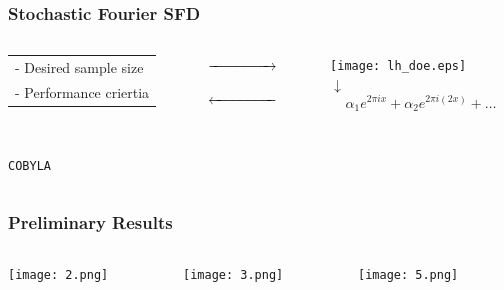 \documentclass[aspectratio=169]{beamer}
\begin{document}
\begin{frame}\frametitle{Stochastic Fourier SFD}
\begin{columns}
\begin{column}{0.3\textwidth}
\begin{center}
\begin{tabular}{l}
 - Desired sample size\\
 - Performance criertia
\end{tabular}\\

\bigskip
\bigskip
\bigskip
\bigskip
\bigskip

{\tt COBYLA}

\end{center}
\end{column}
\begin{column}{0.2\textwidth}

$\xrightarrow{\hspace*{1.5cm}}$\\

\medskip
\bigskip
\bigskip
\bigskip
\bigskip
\bigskip

$\xleftarrow{\hspace*{1.5cm}}$\\

\end{column}
\begin{column}{0.3\textwidth}
\begin{center}
\texttt{[image: lh\_doe.eps]}\\

$\downarrow$\\

$$
\alpha_1 e^{2\pi i x} + \alpha_2 e^{2 \pi i (2x)} + \ldots
$$
\end{center}
\end{column}
\end{columns}
\end{frame}

\begin{frame}\frametitle{Preliminary Results}
\begin{columns}
\begin{column}{0.3\textwidth}
\texttt{[image: 2.png]}\\
\end{column}
\begin{column}{0.3\textwidth}
\texttt{[image: 3.png]}\\
\end{column}
\begin{column}{0.3\textwidth}
\texttt{[image: 5.png]}\\
\end{column}
\end{columns}
\end{frame}
\end{document}
